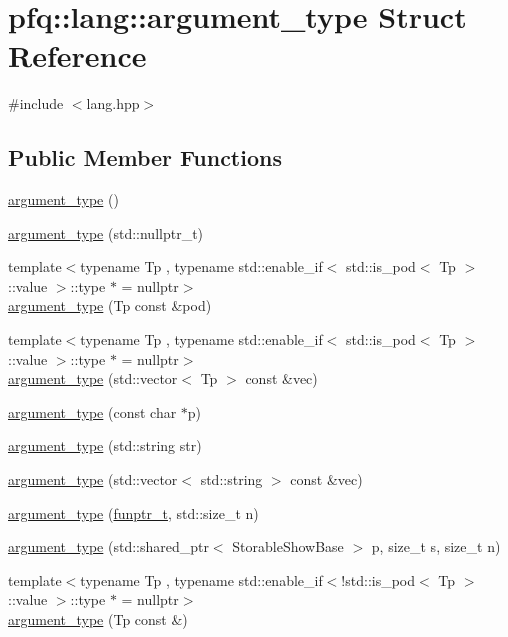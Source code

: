 \hypertarget{structpfq_1_1lang_1_1argument__type}{}\section{pfq\+:\+:lang\+:\+:argument\+\_\+type Struct Reference}
\label{structpfq_1_1lang_1_1argument__type}


{\ttfamily \#include $<$lang.\+hpp$>$}

\subsection*{Public Member Functions}
\begin{DoxyCompactItemize}
\item 
\hyperlink{structpfq_1_1lang_1_1argument__type_aa89bbfb7ed7487d09512e29bc8df723a}{argument\+\_\+type} ()
\item 
\hyperlink{structpfq_1_1lang_1_1argument__type_aaa36abcce4c5e2418fc5a10328619a2d}{argument\+\_\+type} (std\+::nullptr\+\_\+t)
\item 
{\footnotesize template$<$typename Tp , typename std\+::enable\+\_\+if$<$ std\+::is\+\_\+pod$<$ Tp $>$\+::value $>$\+::type $\ast$  = nullptr$>$ }\\\hyperlink{structpfq_1_1lang_1_1argument__type_a1ed803face97c18de5b24a852174f160}{argument\+\_\+type} (Tp const \&pod)
\item 
{\footnotesize template$<$typename Tp , typename std\+::enable\+\_\+if$<$ std\+::is\+\_\+pod$<$ Tp $>$\+::value $>$\+::type $\ast$  = nullptr$>$ }\\\hyperlink{structpfq_1_1lang_1_1argument__type_a214fc2f5dc718677454cde46788cef1d}{argument\+\_\+type} (std\+::vector$<$ Tp $>$ const \&vec)
\item 
\hyperlink{structpfq_1_1lang_1_1argument__type_a775f6b6bf458de21aef78e3b806ead9d}{argument\+\_\+type} (const char $\ast$p)
\item 
\hyperlink{structpfq_1_1lang_1_1argument__type_a568ea3646078a7ab97132cbff3805980}{argument\+\_\+type} (std\+::string str)
\item 
\hyperlink{structpfq_1_1lang_1_1argument__type_ae3ffe6217fd55abcccef156ac2b2f52f}{argument\+\_\+type} (std\+::vector$<$ std\+::string $>$ const \&vec)
\item 
\hyperlink{structpfq_1_1lang_1_1argument__type_a25b9c5fc803a86259615dd54e13a19e8}{argument\+\_\+type} (\hyperlink{structpfq_1_1lang_1_1funptr__t}{funptr\+\_\+t}, std\+::size\+\_\+t n)
\item 
\hyperlink{structpfq_1_1lang_1_1argument__type_a3586d8765421e7a9fc01ee5185be7f32}{argument\+\_\+type} (std\+::shared\+\_\+ptr$<$ Storable\+Show\+Base $>$ p, size\+\_\+t s, size\+\_\+t n)
\item 
{\footnotesize template$<$typename Tp , typename std\+::enable\+\_\+if$<$!std\+::is\+\_\+pod$<$ Tp $>$\+::value $>$\+::type $\ast$  = nullptr$>$ }\\\hyperlink{structpfq_1_1lang_1_1argument__type_a4285751f800858bb96057e3ffd44dc77}{argument\+\_\+type} (Tp const \&)
\end{DoxyCompactItemize}
